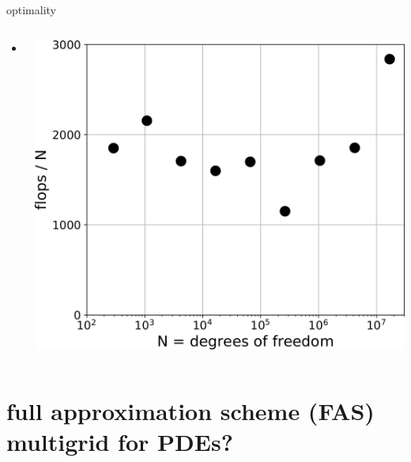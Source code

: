 \documentclass[svgnames,
               hyperref={colorlinks,citecolor=DeepPink4,linkcolor=FireBrick,urlcolor=Maroon},
               usepdftitle=false]  %
               {beamer}
\begin{document}
\begin{frame}{optimality}

\begin{columns}
\begin{column}{0.6\textwidth}
\begin{itemize}
\item x
\end{itemize}
\end{column}
\begin{column}{0.4\textwidth}
\includegraphics[width=\textwidth]{images/obstacle-flops-per-n.png}
\end{column}
\end{columns}
\end{frame}


\section{full approximation scheme (FAS) multigrid for PDEs?}
\end{document}
